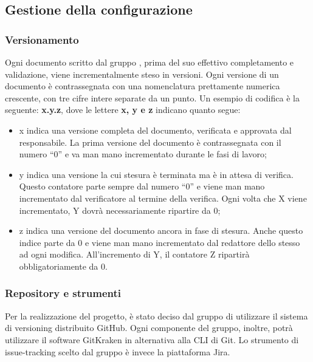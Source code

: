 \subsection{Gestione della configurazione}

\subsubsection{Versionamento}
Ogni documento scritto dal gruppo {\Gruppo}, prima del suo effettivo completamento e validazione, viene incrementalmente steso in versioni. Ogni versione di un documento è contrassegnata con una nomenclatura prettamente numerica crescente, con tre cifre intere separate da un punto. Un esempio di codifica è la seguente: \textbf{x.y.z}, dove le lettere \textbf{x, y e z} indicano quanto segue:
\begin{itemize}
	\item x indica una versione completa del documento, verificata e approvata dal responsabile. La prima versione del documento è contrassegnata con il numero “0” e va man mano incrementato durante le fasi di lavoro;
	\item y indica una versione la cui stesura è terminata ma è in attesa di verifica. Questo contatore parte sempre dal numero “0” e viene man mano incrementato dal verificatore al termine della verifica. Ogni volta che X viene incrementato, Y dovrà necessariamente ripartire da 0;
	\item z indica una versione del documento ancora in fase di stesura. Anche questo indice parte da 0 e viene man mano incrementato dal redattore dello stesso ad ogni modifica. All’incremento di Y, il contatore Z ripartirà obbligatoriamente da 0.
	\end{itemize}

\subsubsection{Repository e strumenti}
Per la realizzazione del progetto, è stato deciso dal gruppo di utilizzare il sistema di versioning distribuito GitHub. Ogni componente del gruppo, inoltre, potrà utilizzare il software GitKraken in alternativa alla CLI di Git. Lo strumento di issue-tracking scelto dal gruppo è invece la piattaforma Jira.

